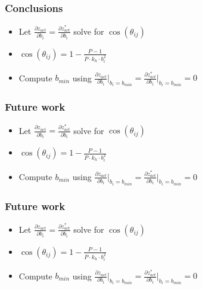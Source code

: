 \documentclass[xcolor=svgnames]{beamer}
\begin{document}
	\begin{frame}
	\frametitle{Conclusions}
	\begin{itemize}
	\item Let $\frac{\partial z_{act}}{\partial b_i} = \frac{\partial z_{act}^*}{\partial b_i}$ solve for $\cos (\theta_{ij})$
	\item $\cos (\theta_{ij}) = 1 - \frac{P-1}{P \cdot k_h \cdot b_i^2}$
	\item Compute $b_{min}$ using $\frac{\partial z_{act}}{\partial b_i} \Bigg|_{b_i = b_{min}} = \frac{\partial z_{act}^*}{\partial b_i} \Bigg|_{b_i = b_{min}} = 0$
	\end{itemize}
	\end{frame}

	\begin{frame}
	\frametitle{Future work}
	\begin{itemize}
	\item Let $\frac{\partial z_{act}}{\partial b_i} = \frac{\partial z_{act}^*}{\partial b_i}$ solve for $\cos (\theta_{ij})$
	\item $\cos (\theta_{ij}) = 1 - \frac{P-1}{P \cdot k_h \cdot b_i^2}$
	\item Compute $b_{min}$ using $\frac{\partial z_{act}}{\partial b_i} \Bigg|_{b_i = b_{min}} = \frac{\partial z_{act}^*}{\partial b_i} \Bigg|_{b_i = b_{min}} = 0$
	\end{itemize}
	\end{frame}

	\begin{frame}
	\frametitle{Future work}
	\begin{itemize}
	\item Let $\frac{\partial z_{act}}{\partial b_i} = \frac{\partial z_{act}^*}{\partial b_i}$ solve for $\cos (\theta_{ij})$
	\item $\cos (\theta_{ij}) = 1 - \frac{P-1}{P \cdot k_h \cdot b_i^2}$
	\item Compute $b_{min}$ using $\frac{\partial z_{act}}{\partial b_i} \Bigg|_{b_i = b_{min}} = \frac{\partial z_{act}^*}{\partial b_i} \Bigg|_{b_i = b_{min}} = 0$
	\end{itemize}
	\end{frame}
    \fi
	
\end{document}
